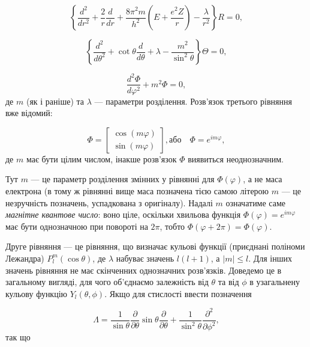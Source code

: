 \documentclass{article}
\begin{document}
\begin{equation}
\left\{ \frac{d^2}{dr^2} + \frac{2}{r} \frac{d}{dr} + \frac{8\pi^2 m}{h^2} \left( E + \frac{e^2Z}{r} \right) - \frac{\lambda}{r^2} \right\} R = 0,
\end{equation}

\begin{equation}
\left\{ \frac{d^2}{d\theta^2} + \cot \theta \frac{d}{d\theta} + \lambda - \frac{m^2}{\sin^2 \theta} \right\} \Theta = 0,
\end{equation}

\begin{equation}
\frac{d^2 \Phi}{d\varphi^2} + m^2 \Phi = 0,
\end{equation}
%
де \( m \) (як і раніше) та \( \lambda \) --- параметри розділення. Розв'язок третього рівняння вже відомий:

\begin{equation}
\Phi = \begin{bmatrix}
\cos(m\varphi)\\
\sin(m\varphi)
\end{bmatrix}
, \text{або} \quad \Phi = e^{im\varphi},
\end{equation}
%
де \( m \) має бути цілим числом, інакше розв'язок \( \Phi \) виявиться неоднозначним.

\begin{note}
Тут \(m\) --- це параметр розділення змінних у рівнянні для $\Phi(\varphi)$, а не маса електрона (в тому ж рівнянні вище маса позначена тією самою літерою $m$ --- це незручність позначень, успадкована з оригіналу). Надалі $m$ означатиме саме \emph{магнітне квантове число}: воно ціле, оскільки хвильова функція $\Phi(\varphi)=e^{im\varphi}$ має бути однозначною при повороті на $2\pi$, тобто $\Phi(\varphi+2\pi)=\Phi(\varphi)$.
\end{note}

Друге рівняння --- це рівняння, що визначає кульові функції (приєднані поліноми Лежандра) $P_l^m(\cos \theta)$, де $\lambda$ набуває значень $l(l+1)$, а $|m| \leq l$. Для інших значень рівняння не має скінченних однозначних розв'язків. Доведемо це в загальному вигляді, для чого об'єднаємо залежність від $\theta$ та від $\phi$ в узагальнену кульову функцію $Y_l(\theta, \phi)$. Якщо для стислості ввести позначення

\begin{equation}
\Lambda = \frac{1}{\sin \theta} \frac{\partial}{\partial \theta} \sin \theta \frac{\partial}{\partial \theta} + \frac{1}{\sin^2 \theta} \frac{\partial^2}{\partial \phi^2},
\end{equation}
%
так що
\end{document}
